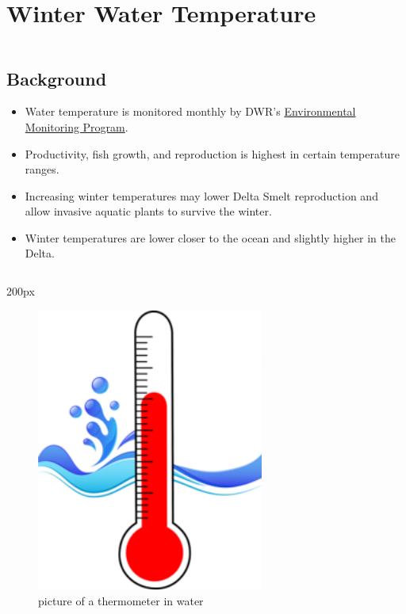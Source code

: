 \documentclass[
]{book}
\providecommand{\tightlist}{%
  \setlength{\itemsep}{0pt}\setlength{\parskip}{0pt}}
\begin{document}
\hypertarget{winter-water-temperature}{%
\section{Winter Water Temperature}\label{winter-water-temperature}}

\begin{column}{0.7\textwidth}
\hypertarget{background-19}{%
\subsection{Background}\label{background-19}}

\begin{itemize}
\tightlist
\item
  Water temperature is monitored monthly by DWR's \href{https://emp.baydeltalive.com/wiki/12297}{Environmental Monitoring Program}.
\item
  Productivity, fish growth, and reproduction is highest in certain temperature ranges.
\item
  Increasing winter temperatures may lower Delta Smelt reproduction and allow invasive aquatic plants to survive the winter.
\item
  Winter temperatures are lower closer to the ocean and slightly higher in the Delta.
\end{itemize}
\end{column}

\begin{column}{200px\textwidth}
\begin{figure}

{\centering \includegraphics[width=2.94in]{figures/thermometer} 

}

\caption{picture of a thermometer in water}\label{fig:unnamed-chunk-150}
\end{figure}
\end{column}
\end{document}
